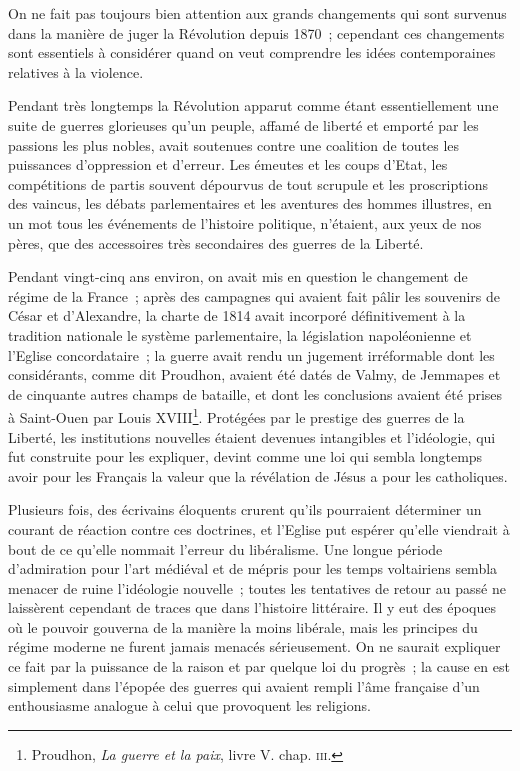 \documentclass[french,twoside]{book} %
\begin{document}
\noindent On ne fait pas toujours bien attention aux grands changements qui sont survenus dans la manière de juger la Révolution depuis 1870 ; cependant ces changements sont essentiels à considérer quand on veut comprendre les idées contemporaines relatives à la violence.\par
Pendant très longtemps la Révolution apparut comme étant essentiellement une suite de guerres glorieuses qu’un peuple, affamé de liberté et emporté par les passions  les plus nobles, avait soutenues contre une coalition de toutes les puissances d’oppression et d’erreur. Les émeutes et les coups d’Etat, les compétitions de partis souvent dépourvus de tout scrupule et les proscriptions des vaincus, les débats parlementaires et les aventures des hommes illustres, en un mot tous les événements de l’histoire politique, n’étaient, aux yeux de nos pères, que des accessoires très secondaires des guerres de la Liberté.\par
Pendant vingt-cinq ans environ, on avait mis en question le changement de régime de la France ; après des campagnes qui avaient fait pâlir les souvenirs de César et d’Alexandre, la charte de 1814 avait incorporé définitivement à la tradition nationale le système parlementaire, la législation napoléonienne et l’Eglise concordataire ; la guerre avait rendu un jugement irréformable dont les considérants, comme dit Proudhon, avaient été datés de Valmy, de Jemmapes et de cinquante autres champs de bataille, et dont les conclusions avaient été prises à Saint-Ouen par Louis XVIII\footnote{ \noindent Proudhon, \emph{La guerre et la paix}, livre V. chap. {\scshape iii}.
 }. Protégées par le prestige des guerres de la Liberté, les institutions nouvelles étaient devenues intangibles et l’idéologie, qui fut construite pour les expliquer, devint comme une loi qui sembla longtemps avoir pour les Français la valeur que la révélation de Jésus a pour les catholiques.\par
Plusieurs fois, des écrivains éloquents crurent qu’ils pourraient déterminer un courant de réaction contre ces doctrines, et l’Eglise put espérer qu’elle viendrait à bout de ce qu’elle nommait l’erreur du libéralisme. Une longue  période d’admiration pour l’art médiéval et de mépris pour les temps voltairiens sembla menacer de ruine l’idéologie nouvelle ; toutes les tentatives de retour au passé ne laissèrent cependant de traces que dans l’histoire littéraire. Il y eut des époques où le pouvoir gouverna de la manière la moins libérale, mais les principes du régime moderne ne furent jamais menacés sérieusement. On ne saurait expliquer ce fait par la puissance de la raison et par quelque loi du progrès ; la cause en est simplement dans l’épopée des guerres qui avaient rempli l’âme française d’un enthousiasme analogue à celui que provoquent les religions.\par
\end{document}
